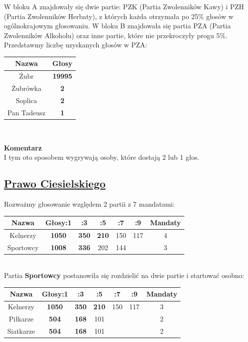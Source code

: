 \documentclass[12pt,a4paper]{article}
\theoremstyle{break}
\newcommand{\Komentarz}[1]{
	\begin{mdframed}[style=zadanie]
		\textbf{Komentarz}\\
		#1
	\end{mdframed}
	}
\begin{document}
W bloku A znajdowały się dwie partie: PZK (Partia Zwolenników Kawy) i PZH (Partia Zwolenników Herbaty), z których każda otrzymała po 25\% głosów w ogólnokrajowym głosowaniu. W bloku B znajdowała się partia PZA (Partia Zwolenników Alkoholu) oraz inne partie, które nie przekroczyły progu 5\%. Przedstawmy liczbę uzyskanych głosów w PZA:

\begin{tabular}{|c|c|}\hline
	Nazwa       & Głosy\\\hline
	Żubr        & \textbf{19995}\\\hline
	Żubrówka    & \textbf{2}\\\hline
	Soplica     & \textbf{2}\\\hline
	Pan Tadeusz & \textbf{1}\\\hline
\end{tabular}\\

\Komentarz{I tym oto sposobem wygrywają osoby, które dostają 2 lub 1 głos.}

\subsection{\href{http://www.racjonalista.pl/kk.php/s,9848/k,3}{Prawo Ciesielskiego}}

Rozważmy głosowanie względem 2 partii z 7 mandatami:

\begin{tabular}{|c|c|c|c|c|c|c|}\hline
	Nazwa        & Głosy:1 & :3 & :5  & :7  & :9  & Mandaty\\\hline
	Kelnerzy     & \textbf{1050} & \textbf{350} & \textbf{210} & 150 & 117  & 4\\\hline
	Sportowcy    & \textbf{1008} & \textbf{336} & 202  & 144 &      & 3\\\hline
\end{tabular}\\

Partia \textbf{Sportowcy} postanowiła się rozdzielić na dwie partie i startować osobno:

\begin{tabular}{|c|c|c|c|c|c|c|}\hline
	Nazwa        & Głosy:1 & :3 & :5  & :7  & :9  & Mandaty\\\hline
	Kelnerzy     & \textbf{1050} & \textbf{350} & \textbf{210} & 150 & 117  & 3\\\hline
	Piłkarze     & \textbf{504}  & \textbf{168} & 101  &     &      & 2\\\hline
	Siatkarze    & \textbf{504}  & \textbf{168} & 101  &     &      & 2\\\hline
\end{tabular}\\
\end{document}
